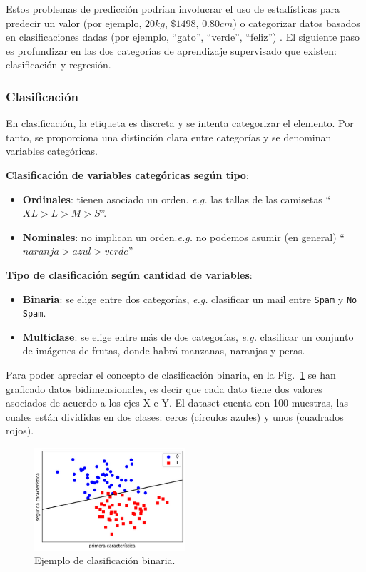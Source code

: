 \documentclass[a4paper,12pt]{article}
\begin{document}
Estos problemas de predicción podrían involucrar el uso de estadísticas para predecir un valor (por ejemplo, $20 kg$, $\$1498$, $0.80 cm$) o categorizar datos basados en clasificaciones dadas (por ejemplo, ``gato'', ``verde'', ``feliz'') \cite{norman2019aprendizaje}. El siguiente paso es profundizar en las dos categorías de aprendizaje supervisado que existen: clasificación y regresión.

\subsubsection{Clasificación}

En clasificación, la etiqueta es discreta y se intenta categorizar el elemento. Por tanto, se proporciona una distinción clara entre categorías y se denominan variables categóricas.

\textbf{Clasificación de variables categóricas según tipo}: 
\begin{itemize}[noitemsep, topsep=2pt]
	\item \textbf{Ordinales}: tienen asociado un orden. \textit{e.g.} las tallas de las camisetas ``$XL > L > M > S$''.
	\item \textbf{Nominales}: no implican un orden.\textit{e.g.} no podemos asumir (en general) ``$naranja > azul > verde$''
\end{itemize}

\textbf{Tipo de clasificación según cantidad de variables}:
\begin{itemize}[noitemsep, topsep=2pt]
	\item \textbf{Binaria}: se elige entre dos categorías, \textit{e.g.} clasificar un mail entre \texttt{Spam} y \texttt{No Spam}.
	\item \textbf{Multiclase}: se elige entre más de dos categorías, \textit{e.g.} clasificar un conjunto de imágenes de frutas, donde habrá manzanas, naranjas y peras. 
\end{itemize} 

Para poder apreciar el concepto de clasificación binaria, en la Fig.~\ref{fig:binaryclassification.}  \cite{GitHubpa25:online} se han graficado datos bidimensionales, es decir que cada dato tiene dos valores asociados de acuerdo a los ejes X e Y. El dataset cuenta con 100 muestras, las cuales están divididas en dos clases: ceros (círculos azules) y unos (cuadrados rojos). 

\begin{figure}[H]
	\begin{center}				
		\includegraphics[width=0.5\textwidth]{tesis_2.png}
		\caption{Ejemplo de clasificación binaria.}
		\label{fig:binaryclassification.}
	\end{center}
\end{figure}
\end{document}
